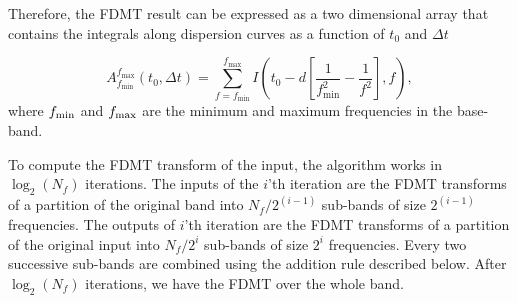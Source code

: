 \documentclass[iop]{emulateapj}
\begin{document}
Therefore, the FDMT result can be expressed as
a two dimensional array that contains the integrals
along dispersion curves as a function of
$t_{0}$ and $\Delta{t}$

\begin{equation}\label{parametrization}
A_{f_{\min}}^{f_{\max}}(t_0,\Delta t) = \sum_{f=f_{\min}}^{f_{\max}}{I(t_0 -d\left[\frac{1}{f_{\min}^2} - \frac{1}{f^2}\right],f)},
\end{equation}
where $f_{\rm min}$ and $f_{\rm max}$ are the minimum and maximum frequencies in the base-band. 

To compute the FDMT transform of the input, the algorithm works in $\log_2(N_f)$ iterations. 
The inputs of the $i$'th iteration are the FDMT transforms of a partition of the original band into $N_f/2^{(i-1)}$ sub-bands of size $2^{(i-1)}$ frequencies.  
The outputs of $i$'th iteration are the FDMT transforms of a partition of the original input into $N_f/2^i$ sub-bands of size $2^{i}$ frequencies. Every two successive sub-bands are combined using the addition rule described below. 
After $\log_2(N_f)$ iterations, we have the FDMT over the whole band.
\end{document}

